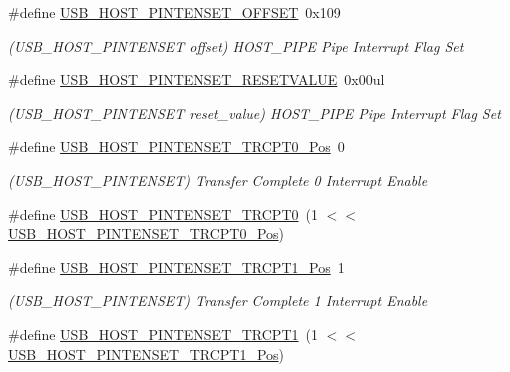 \begin{DoxyCompactItemize}
\#define \mbox{\hyperlink{group___s_a_m_d21___u_s_b_ga0cdfa1da0694cabbdad4079707f72c64}{U\+S\+B\+\_\+\+H\+O\+S\+T\+\_\+\+P\+I\+N\+T\+E\+N\+S\+E\+T\+\_\+\+O\+F\+F\+S\+ET}}~0x109
\begin{DoxyCompactList}\small\item\em (U\+S\+B\+\_\+\+H\+O\+S\+T\+\_\+\+P\+I\+N\+T\+E\+N\+S\+ET offset) H\+O\+S\+T\+\_\+\+P\+I\+PE Pipe Interrupt Flag Set \end{DoxyCompactList}\item 
\#define \mbox{\hyperlink{group___s_a_m_d21___u_s_b_gae48fd472180bff8dd9cea691ba2b74b3}{U\+S\+B\+\_\+\+H\+O\+S\+T\+\_\+\+P\+I\+N\+T\+E\+N\+S\+E\+T\+\_\+\+R\+E\+S\+E\+T\+V\+A\+L\+UE}}~0x00ul
\begin{DoxyCompactList}\small\item\em (U\+S\+B\+\_\+\+H\+O\+S\+T\+\_\+\+P\+I\+N\+T\+E\+N\+S\+ET reset\+\_\+value) H\+O\+S\+T\+\_\+\+P\+I\+PE Pipe Interrupt Flag Set \end{DoxyCompactList}\item 
\#define \mbox{\hyperlink{group___s_a_m_d21___u_s_b_ga4b7651b4e3d83869c6c045765079992f}{U\+S\+B\+\_\+\+H\+O\+S\+T\+\_\+\+P\+I\+N\+T\+E\+N\+S\+E\+T\+\_\+\+T\+R\+C\+P\+T0\+\_\+\+Pos}}~0
\begin{DoxyCompactList}\small\item\em (U\+S\+B\+\_\+\+H\+O\+S\+T\+\_\+\+P\+I\+N\+T\+E\+N\+S\+ET) Transfer Complete 0 Interrupt Enable \end{DoxyCompactList}\item 
\#define \mbox{\hyperlink{group___s_a_m_d21___u_s_b_ga242d35e07e6395f6086704468a22d0c0}{U\+S\+B\+\_\+\+H\+O\+S\+T\+\_\+\+P\+I\+N\+T\+E\+N\+S\+E\+T\+\_\+\+T\+R\+C\+P\+T0}}~(1 $<$$<$ \mbox{\hyperlink{group___s_a_m_d21___u_s_b_ga4b7651b4e3d83869c6c045765079992f}{U\+S\+B\+\_\+\+H\+O\+S\+T\+\_\+\+P\+I\+N\+T\+E\+N\+S\+E\+T\+\_\+\+T\+R\+C\+P\+T0\+\_\+\+Pos}})
\item 
\#define \mbox{\hyperlink{group___s_a_m_d21___u_s_b_gabeb57796072c3677ac72065856f724fd}{U\+S\+B\+\_\+\+H\+O\+S\+T\+\_\+\+P\+I\+N\+T\+E\+N\+S\+E\+T\+\_\+\+T\+R\+C\+P\+T1\+\_\+\+Pos}}~1
\begin{DoxyCompactList}\small\item\em (U\+S\+B\+\_\+\+H\+O\+S\+T\+\_\+\+P\+I\+N\+T\+E\+N\+S\+ET) Transfer Complete 1 Interrupt Enable \end{DoxyCompactList}\item 
\#define \mbox{\hyperlink{group___s_a_m_d21___u_s_b_ga9b6597376ac082e59929c704546d5eb8}{U\+S\+B\+\_\+\+H\+O\+S\+T\+\_\+\+P\+I\+N\+T\+E\+N\+S\+E\+T\+\_\+\+T\+R\+C\+P\+T1}}~(1 $<$$<$ \mbox{\hyperlink{group___s_a_m_d21___u_s_b_gabeb57796072c3677ac72065856f724fd}{U\+S\+B\+\_\+\+H\+O\+S\+T\+\_\+\+P\+I\+N\+T\+E\+N\+S\+E\+T\+\_\+\+T\+R\+C\+P\+T1\+\_\+\+Pos}})

\end{DoxyCompactItemize}
